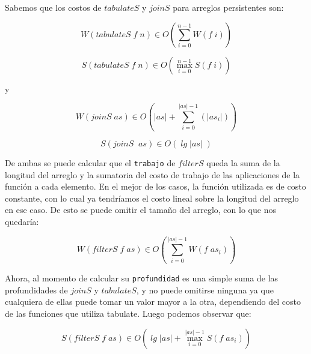 \documentclass[a4paper,10pt]{article}
\begin{document}
    Sabemos que los costos de $tabulateS$ y $joinS$ para arreglos persistentes son:

\begin{equation*}
    W \left(tabulateS \;f \;n \right) \in
    O \left( \sum_{i=0}^{n-1} W \left( f\; i \right) \right)
\end{equation*}

\bigskip

\begin{equation*}
    S \left( tabulateS \;f \;n \right) \in
    O \left( \max_{i=0}^{n-1} S \left( f\; i \right) \right)
\end{equation*}

\smallskip
\begin{center}
y
\end{center}

\begin{equation*}
    W \left(joinS \;as\right) \in
    O \left( \vert as \vert + \sum_{i=0}^{\vert as \vert -1} \left( \vert as_i \vert \right) \right)
\end{equation*}

\begin{equation*}
    S \left(joinS\; \; as \right) \in
    O \left( \;lg \; \vert as \vert \; \right)
\end{equation*}


\bigskip
\bigskip

    De ambas se puede calcular que el \texttt{trabajo} de $filterS$ queda la
suma de la longitud del arreglo y la sumatoria del costo de trabajo de las
aplicaciones de la función a cada elemento. En el mejor de los casos, la función
utilizada es de costo constante, con lo cual ya tendríamos el costo lineal sobre
la longitud del arreglo en ese caso. De esto se puede omitir el tamaño del arreglo,
con lo que nos quedaría:
 
\begin{equation*}
    W \left(filterS \;f \;as \right) \in
    O \left( \sum_{i=0}^{\vert as \vert -1} W \left( f\; as_i \right) \right)
\end{equation*}

\bigskip

    Ahora, al momento de calcular su \texttt{profundidad} es una simple suma
de las profundidades de $joinS$ y $tabulateS$, y no puede omitirse ninguna ya
que cualquiera de ellas puede tomar un valor mayor a la otra, dependiendo del
costo de las funciones que utiliza tabulate. Luego podemos observar que:

\begin{equation*}
    S \left( filterS \;f \;as \right) \in
    O \left( \;lg \; \vert as \vert + \max_{i=0}^{\vert as \vert -1} S \left( f\; as_i \right) \right)
\end{equation*}
\end{document}
